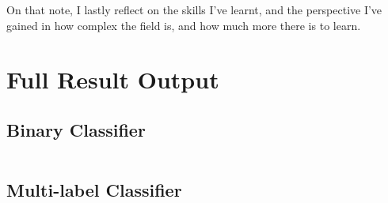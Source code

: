 \documentclass{UoNMCHA}
\numberwithin{equation}{section}
\begin{document}
On that note, I lastly reflect on the skills I've learnt, and the perspective I've gained in how complex the field is, and how much more there is to learn.


\section{Full Result Output}

\subsection{Binary Classifier}
\begin{lstlisting}

\end{lstlisting}
\subsection{Multi-label Classifier}
\end{document}
